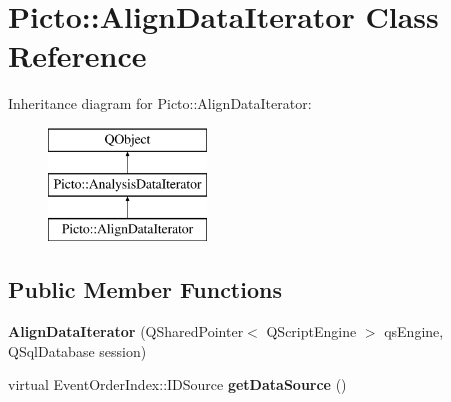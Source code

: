 \hypertarget{class_picto_1_1_align_data_iterator}{\section{Picto\-:\-:Align\-Data\-Iterator Class Reference}
\label{class_picto_1_1_align_data_iterator}
}
Inheritance diagram for Picto\-:\-:Align\-Data\-Iterator\-:\begin{figure}[H]
\begin{center}
\leavevmode
\includegraphics[height=3.000000cm]{class_picto_1_1_align_data_iterator}
\end{center}
\end{figure}
\subsection*{Public Member Functions}
\begin{DoxyCompactItemize}
\item 
\hypertarget{class_picto_1_1_align_data_iterator_a6e95ec1e4ff9ad6ec203205db0444fca}{{\bfseries Align\-Data\-Iterator} (Q\-Shared\-Pointer$<$ Q\-Script\-Engine $>$ qs\-Engine, Q\-Sql\-Database session)}\label{class_picto_1_1_align_data_iterator_a6e95ec1e4ff9ad6ec203205db0444fca}

\item 
\hypertarget{class_picto_1_1_align_data_iterator_a3b5c589014f40f12d376add9c3ec25a7}{virtual Event\-Order\-Index\-::\-I\-D\-Source {\bfseries get\-Data\-Source} ()}\label{class_picto_1_1_align_data_iterator_a3b5c589014f40f12d376add9c3ec25a7}

\end{DoxyCompactItemize}
